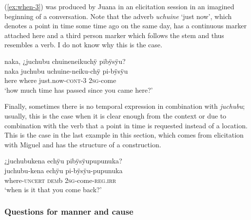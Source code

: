 (\ref{ex:when-3}) was produced by Juana in an elicitation session in an imagined beginning of a conversation. Note that the adverb \textit{uchuine} ‘just now', which denotes a point in time some time ago on the same day, has a continuous marker attached here and a third person marker which follows the stem and thus resembles a verb. I do not know why this is the case.

\ea\label{ex:when-3}
\begingl
\glpreamble naka, ¿juchubu chuineneikuchÿ pibÿsÿu?\\
\gla naka juchubu uchuine-neiku-chÿ pi-bÿsÿu\\
\glb here where just.now-\textsc{cont}-3 2\textsc{sg}-come\\
\glft ‘how much time has passed since you came here?’
\endgl
\trailingcitation{[jxx-e150925l-1.038]}
\xe

\hspace*{-5.8pt}Finally, sometimes there is no temporal expression in combination with \textit{juchubu}; usually, this is the case when it is clear enough from the context or due to combination with the verb that a point in time is requested instead of a location. This is the case in the last example in this section, which comes from elicitation with Miguel and has the structure of a  construction.

\ea\label{ex:when-4}
\begingl
\glpreamble ¿juchubukena echÿu pibÿsÿupupunuka?\\
\gla juchubu-kena echÿu pi-bÿsÿu-pupunuka\\
\glb where-\textsc{uncert} \textsc{dem}b 2\textsc{sg}-come-\textsc{reg.irr}\\
\glft ‘when is it that you come back?’
\endgl
\trailingcitation{[mxx-e090728s-1.48]}
\xe

\subsubsection{Questions for manner and cause}\label{sec:Q_chikuyena}

